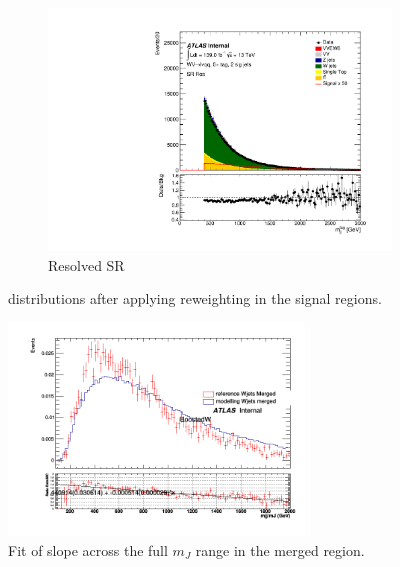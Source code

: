 \begin{figure}[ht]
\begin{subfigure}[b]{0.3\textwidth}
        \centering
        \includegraphics[width=\textwidth]{figures/mjjreweight1lep/SR_Res/stacked_plot_resolved_tagMjj.pdf}
        \caption{Resolved SR}
        \label{fig:MC16ADE_Resolved_SR}
    \end{subfigure}
    \caption{\mjjtag distributions after applying reweighting in the signal regions.}
    \label{fig:mjjReweight1LepMjjDistAfter}
\end{figure}


\begin{figure}[ht]
    \centering
    \includegraphics[width=0.7\textwidth]{figures/mjjreweight1lep/merged_WjetsAllMC16T.png}
    \caption{Fit of \mjjtag slope across the full $m_{J}$ range in the merged region.}
    \label{fig:mjjReweight1LepMer}
\end{figure}

